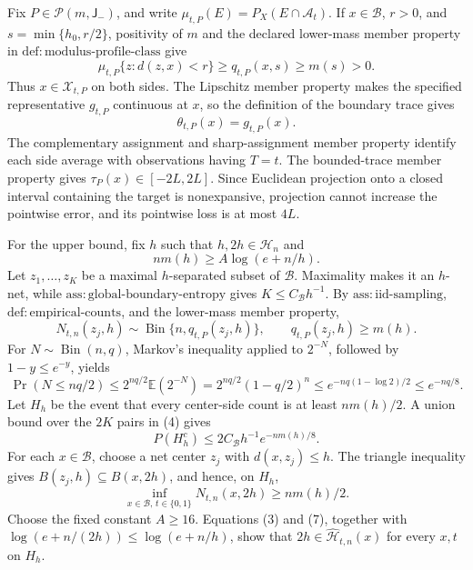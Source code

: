 Fix \(P\in\mathcal P(m,\mathsf J_{-})\), and write \(\mu_{t,P}(E)=P_X(E\cap\mathcal A_t)\).  If \(x\in\mathcal B\), \(r>0\), and \(s=\min\{h_0,r/2\}\), positivity of \(m\) and the declared lower-mass member property in \(\mathrm{def:modulus\text{-}profile\text{-}class}\) give
\[
 \mu_{t,P}\{z:d(z,x)<r\}\ge q_{t,P}(x,s)\ge m(s)>0. \tag{1}
\]
Thus \(x\in\mathcal X_{t,P}\) on both sides.  The Lipschitz member property makes the specified representative \(g_{t,P}\) continuous at \(x\), so the definition of the boundary trace gives
\[
 \theta_{t,P}(x)=g_{t,P}(x). \tag{2}
\]
The complementary assignment and sharp-assignment member property identify each side average with observations having \(T=t\).  The bounded-trace member property gives \(\tau_P(x)\in[-2L,2L]\).  Since Euclidean projection onto a closed interval containing the target is nonexpansive, projection cannot increase the pointwise error, and its pointwise loss is at most \(4L\).

For the upper bound, fix \(h\) such that \(h,2h\in\mathcal H_n\) and
\[
 nm(h)\ge A\log(e+n/h). \tag{3}
\]
Let \(z_1,\ldots,z_K\) be a maximal \(h\)-separated subset of \(\mathcal B\).  Maximality makes it an \(h\)-net, while \(\mathrm{ass:global\text{-}boundary\text{-}entropy}\) gives \(K\le C_{\mathcal B}h^{-1}\).  By \(\mathrm{ass:iid\text{-}sampling}\), \(\mathrm{def:empirical\text{-}counts}\), and the lower-mass member property,
\[
 N_{t,n}(z_j,h)\sim\operatorname{Bin}\{n,q_{t,P}(z_j,h)\},
 \qquad q_{t,P}(z_j,h)\ge m(h). \tag{4}
\]
For \(N\sim\operatorname{Bin}(n,q)\), Markov's inequality applied to \(2^{-N}\), followed by \(1-y\le e^{-y}\), yields
\[
 \Pr(N\le nq/2)
 \le 2^{nq/2}\mathbb E(2^{-N})
 =2^{nq/2}(1-q/2)^n
 \le e^{-nq(1-\log 2)/2}
 \le e^{-nq/8}. \tag{5}
\]
Let \(H_h\) be the event that every center-side count is at least \(nm(h)/2\).  A union bound over the \(2K\) pairs in (4) gives
\[
 P(H_h^c)\le2C_{\mathcal B}h^{-1}e^{-nm(h)/8}. \tag{6}
\]
For each \(x\in\mathcal B\), choose a net center \(z_j\) with \(d(x,z_j)\le h\).  The triangle inequality gives \(B(z_j,h)\subseteq B(x,2h)\), and hence, on \(H_h\),
\[
 \inf_{x\in\mathcal B,\,t\in\{0,1\}}N_{t,n}(x,2h)\ge nm(h)/2. \tag{7}
\]
Choose the fixed constant \(A\ge16\).  Equations (3) and (7), together with \(\log(e+n/(2h))\le\log(e+n/h)\), show that \(2h\in\widehat{\mathcal H}_{t,n}(x)\) for every \(x,t\) on \(H_h\).

